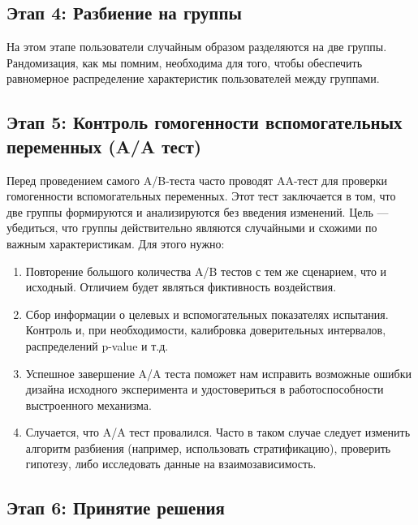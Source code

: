         \subsection*{Этап 4: Разбиение на группы}

        На этом этапе пользователи случайным образом разделяются на две группы.
        Рандомизация, как мы помним, необходима для того, чтобы обеспечить равномерное распределение характеристик пользователей между группами.

        \subsection*{Этап 5: Контроль гомогенности вспомогательных переменных (A/A тест)}

            Перед проведением самого A/B-теста часто проводят AA-тест для проверки гомогенности вспомогательных переменных.
            Этот тест заключается в том, что две группы формируются и анализируются без введения изменений.
            Цель — убедиться, что группы действительно являются случайными и схожими по важным характеристикам.
            Для этого нужно:

            \begin{enumerate}
                \item Повторение большого количества A/B тестов с тем же сценарием, что и исходный.
                    Отличием будет являться фиктивность воздействия.
                \item Сбор информации о целевых и вспомогательных показателях испытания.
                    Контроль и, при необходимости, калибровка доверительных интервалов, распределений p-value и т.д.
                \item Успешное завершение A/A теста поможет нам исправить возможные ошибки дизайна исходного эксперимента и удостовериться в работоспособности выстроенного механизма.
                \item Случается, что A/A тест провалился.
                    Часто в таком случае следует изменить алгоритм разбиения (например, использовать стратификацию), проверить гипотезу, либо исследовать данные на взаимозависимость.
            \end{enumerate}

        \subsection*{Этап 6: Принятие решения}

